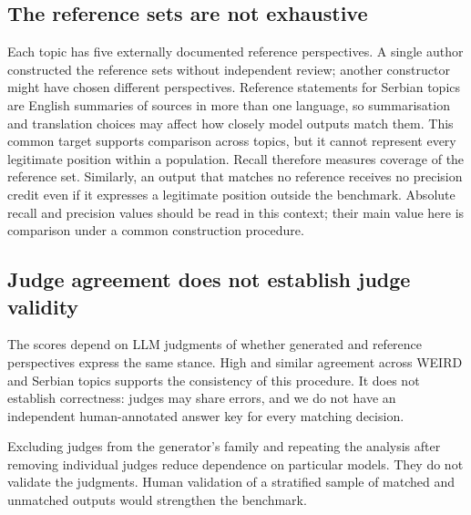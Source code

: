 \documentclass[11pt,a4paper]{article}
\begin{document}
\subsection{The reference sets are not exhaustive}
\label{sec:The reference sets are not exhaustive}
Each topic has five externally documented reference perspectives. A single author constructed the reference sets without independent review; another constructor might have chosen different perspectives. Reference statements for Serbian topics are English summaries of sources in more than one language, so summarisation and translation choices may affect how closely model outputs match them. This common target supports comparison across topics, but it cannot represent every legitimate position within a population. Recall therefore measures coverage of the reference set. Similarly, an output that matches no reference receives no precision credit even if it expresses a legitimate position outside the benchmark. Absolute recall and precision values should be read in this context; their main value here is comparison under a common construction procedure.

\subsection{Judge agreement does not establish judge validity}
\label{sec:Judge agreement does not establish judge validity}
The scores depend on LLM judgments of whether generated and reference perspectives express the same stance. High and similar agreement across WEIRD and Serbian topics supports the consistency of this procedure. It does not establish correctness: judges may share errors, and we do not have an independent human-annotated answer key for every matching decision.

Excluding judges from the generator's family and repeating the analysis after removing individual judges reduce dependence on particular models. They do not validate the judgments. Human validation of a stratified sample of matched and unmatched outputs would strengthen the benchmark.
\end{document}
